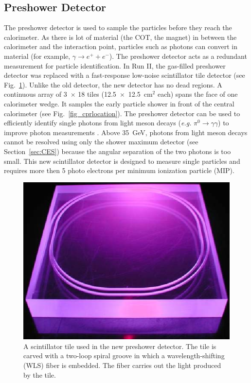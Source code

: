 \subsection{Preshower Detector}\label{sec:CPR}
The preshower detector is used to sample the particles before they reach the calorimeter. As there is lot of material (the COT, the magnet) in between the calorimeter and the interaction point, particles such as photons can convert in material (for example, $\gamma\to e^{+}+e^{-}$). The preshower detector acts as a redundant measurement for particle identification. In Run II, the gas-filled preshower detector was replaced with a fast-response low-noise scintillator tile detector (see Fig.~\ref{fig:CPRtile}). Unlike the old detector, the new detector has no dead regions. A continuous array of 3~$\times$ 18 tiles (12.5~$\times$~12.5~cm$^2$ each) spans the face of one calorimeter wedge. It samples the early particle shower in front of the central calorimeter (see Fig.~\ref{fig_cprlocation}). The preshower detector can be used to efficiently identify single photons from light meson decays (\textit{e.g.} $\pi^{0}\rightarrow\gamma\gamma$) to improve photon measurements \cite{pap:CPRdetector}. Above 35~GeV, photons from light meson decays cannot be resolved using only the shower maximum detector (see Section~\ref{sec:CES}) because the angular separation of the two photons is too small. This new scintillator detector is designed to measure single particles and requires more then 5 photo electrons per minimum ionization particle (MIP).

\begin{figure}[htb!]
 \centering
 \includegraphics[scale=.5]{./CPRtile.png}
 \caption{A scintillator tile used in the new preshower detector. The tile is carved with a two-loop spiral groove in which a wavelength-shifting (WLS) fiber is embedded. The fiber carries out the light produced by the tile.}
 \label{fig:CPRtile}
\end{figure}


